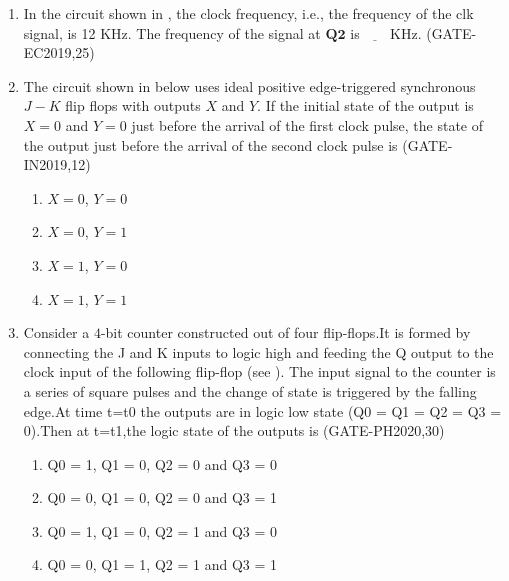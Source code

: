 \begin{enumerate}[label=\arabic*.,ref=\theenumi]
\item In the circuit shown
	in ,
the clock frequency, i.e., the frequency of the clk signal, is 12 KHz. The frequency of the signal at $\mathbf{Q2}$ is $\underline{\hspace{18pt}}$ KHz.
		\hfill(GATE-EC2019,25)
	\begin{figure}[H]
    \centering
    \resizebox{0.75\columnwidth}{!}{%
			
			}
    \caption{}
	\label{fig:GATE-EC2019,25}
\end{figure}
%
 \item The circuit shown in 
below uses ideal positive edge-triggered synchronous $J-K$ flip flops with outputs $X$ and $Y$. If the initial state of the output is $X=0$ and $Y=0$ just before the arrival of the first clock pulse, the state of the output just before the arrival of the second clock pulse is
              \hfill(GATE-IN2019,12)
	\begin{figure}[H]
    \centering
    \resizebox{0.75\columnwidth}{!}{%
    
	}
    \caption{}
	\label{fig:GATE-IN2019,12}
\end{figure}
%
\begin{enumerate}
    \item $X=0$, $Y=0$
    \item $X=0$, $Y=1$
    \item $X=1$, $Y=0$
    \item$X=1$, $Y=1$
\end{enumerate}

\item Consider a $4$-bit counter constructed out of four flip-flops.It is formed by connecting the J and K inputs to logic high and feeding the Q output to the clock input of the following flip-flop (see 
). The input signal to the counter is a series of square pulses and the change of state is triggered by the falling edge.At time t=t0 the outputs are in logic low state (Q0 = Q1 = Q2 = Q3 = 0).Then at t=t1,the logic state of the outputs is 
		               \hfill(GATE-PH2020,30)
\begin{figure}[H]
    \centering
    \resizebox{0.75\columnwidth}{!}{%

	}
    \caption{}
	\label{fig:GATE-PH2020,30}
\end{figure}
%
\begin{enumerate}
\item  Q0 = 1, Q1 = 0, Q2 = 0 and Q3 = 0 
\item  Q0 = 0, Q1 = 0, Q2 = 0 and Q3 = 1
\item  Q0 = 1, Q1 = 0, Q2 = 1 and Q3 = 0
\item  Q0 = 0, Q1 = 1, Q2 = 1 and Q3 = 1
\end{enumerate}





\end{enumerate}
